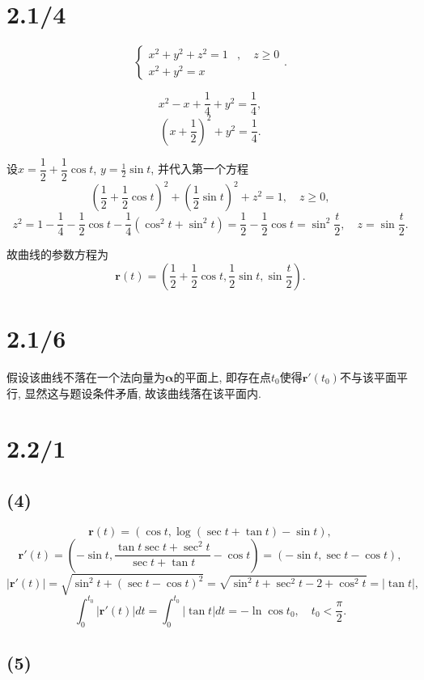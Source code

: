 \documentclass[11pt,a4paper]{article}
\author{刘逸灏 (515370910207)}
\begin{document}
\maketitle

\section{2.1/4}
$$
  \left\{
  \begin{aligned}
    x^2+y^2+z^2=1 & ,\quad z\geqslant0 \\
    x^2+y^2=x     &
  \end{aligned}
  \right..
$$

$$x^2-x+\frac{1}{4}+y^2=\frac{1}{4},$$
$$\left(x+\frac{1}{2}\right)^2+y^2=\frac{1}{4}.$$

设$x=\dfrac{1}{2}+\dfrac{1}{2}\cos t$, $y=\frac{1}{2}\sin t$, 并代入第一个方程
$$\left(\frac{1}{2}+\frac{1}{2}\cos t\right)^2+\left(\frac{1}{2}\sin t\right)^2+z^2=1,\quad z\geqslant0,$$
$$z^2=1-\frac{1}{4}-\frac{1}{2}\cos t-\frac{1}{4}(\cos^2t+\sin^2t)=\frac{1}{2}-\frac{1}{2}\cos t=\sin^2\frac{t}{2},\quad z=\sin\frac{t}{2}.$$

故曲线的参数方程为
$$\mathbf{r}(t)=\left(\frac{1}{2}+\frac{1}{2}\cos t,\frac{1}{2}\sin t,\sin\frac{t}{2}\right).$$

\section{2.1/6}

假设该曲线不落在一个法向量为$\boldsymbol\alpha$的平面上, 即存在点$t_0$使得$\mathbf{r}'(t_0)$不与该平面平行, 显然这与题设条件矛盾, 故该曲线落在该平面内.

\section{2.2/1}

\subsection*{(4)}

$$\mathbf{r}(t)=(\cos t, \log(\sec t+\tan t)-\sin t),$$
$$\mathbf{r}'(t)=\left(-\sin t, \frac{\tan t\sec t+\sec^2t}{\sec t+\tan t} -\cos t\right)=(-\sin t,\sec t-\cos t),$$
$$|\mathbf{r}'(t)|=\sqrt{\sin^2t+(\sec t-\cos t)^2}=\sqrt{\sin^2t+\sec^2t-2+\cos^2t}=|\tan t|,$$
$$\int_0^{t_0}|\mathbf{r}'(t)|dt=\int_0^{t_0}|\tan t|dt=-\ln\cos t_0,\quad t_0<\frac{\pi}{2}.$$

\subsection*{(5)}
\end{document}
